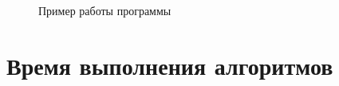 \begin{figure}[H]
	\caption{Пример работы программы}
	\label{img:run}
\end{figure}
\clearpage

\section{Время выполнения алгоритмов}


